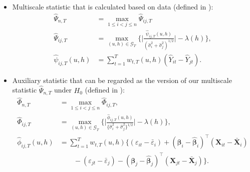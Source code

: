 \documentclass[a4paper,12pt]{article}
\makeatletter
\renewcommand{\eqref}[1]{\tagform@{\ref{#1}}}
\makeatother
\begin{document}
\begin{itemize}
\item Multiscale statistic that is calculated based on data (defined in \eqref{Psi-hat-statistic}):
\begin{align}\label{eq-stat-1}
	\widehat{\Psi}_{n,T} & = \max_{1 \le i < j \le n} \widehat{\Psi}_{ij,T}\nonumber\\
      	\widehat{\Psi}_{ij,T} &= \max_{(u,h) \in \mathcal{G}_T} \Big\{ \Big|\frac{\widehat{\psi}_{ij,T}(u,h)}{(\widehat{\sigma}_i^2 + \widehat{\sigma}_j^2)^{1/2}}\Big| - \lambda(h) \Big\},\\
        \widehat{\psi}_{ij,T}(u,h) &= \sum\limits_{t=1}^T w_{t,T}(u,h)(\widehat{Y}_{it} - \widehat{Y}_{jt}). \nonumber
\end{align}

\item Auxiliary statistic that can be regarded as the version of our multiscale statistic $\widehat{\Psi}_{n, T}$ under $H_0$ (defined in \eqref{Phi-hat-statistic}):
\begin{align}\label{eq-stat-2}
	\widehat{\Phi}_{n,T} &= \max_{1 \le i < j \le n} \widehat{\Phi}_{ij,T},\nonumber \\
	\widehat{\Phi}_{ij,T} &= \max_{(u,h) \in \mathcal{G}_T} \Big\{ \Big| \frac{\widehat{\phi}_{ij,T}(u,h)} {\{ \widehat{\sigma}_i^2 + \widehat{\sigma}_j^2 \}^{1/2}} \Big| - \lambda(h) \Big \}, \\
	\widehat{\phi}_{ij,T}(u,h) &= \sum_{t=1}^T w_{t,T}(u,h) \big\{ (\varepsilon_{it} - \bar{\varepsilon}_i) + (\bm{\beta}_i - \widehat{\bm{\beta}}_i)^\top (\mathbf{X}_{it} - \bar{\mathbf{X}}_{i})  \nonumber \\
	&\quad\quad - (\varepsilon_{jt} - \bar{\varepsilon}_j) -  (\bm{\beta}_j - \widehat{\bm{\beta}}_j)^\top (\mathbf{X}_{jt} - \bar{\mathbf{X}}_{j})\big\}.\nonumber 
\end{align}


\end{itemize}
\end{document}

